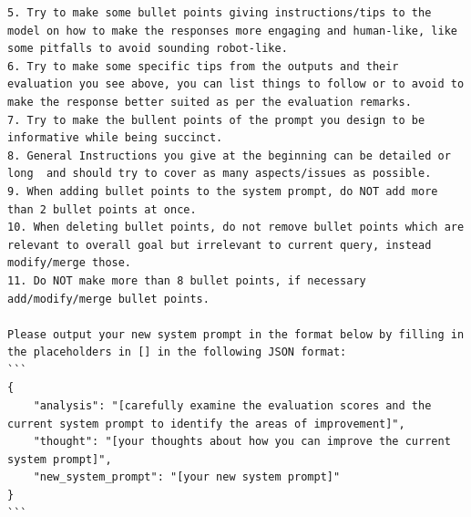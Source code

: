 \begin{lstlisting}[breaklines=true,breakatwhitespace=true]
5. Try to make some bullet points giving instructions/tips to the model on how to make the responses more engaging and human-like, like some pitfalls to avoid sounding robot-like.
6. Try to make some specific tips from the outputs and their evaluation you see above, you can list things to follow or to avoid to make the response better suited as per the evaluation remarks.
7. Try to make the bullent points of the prompt you design to be informative while being succinct.
8. General Instructions you give at the beginning can be detailed or long  and should try to cover as many aspects/issues as possible.
9. When adding bullet points to the system prompt, do NOT add more than 2 bullet points at once.
10. When deleting bullet points, do not remove bullet points which are relevant to overall goal but irrelevant to current query, instead modify/merge those.
11. Do NOT make more than 8 bullet points, if necessary add/modify/merge bullet points.

Please output your new system prompt in the format below by filling in the placeholders in [] in the following JSON format:
```
{
    "analysis": "[carefully examine the evaluation scores and the current system prompt to identify the areas of improvement]",
    "thought": "[your thoughts about how you can improve the current system prompt]",
    "new_system_prompt": "[your new system prompt]"
}
```
\end{lstlisting}